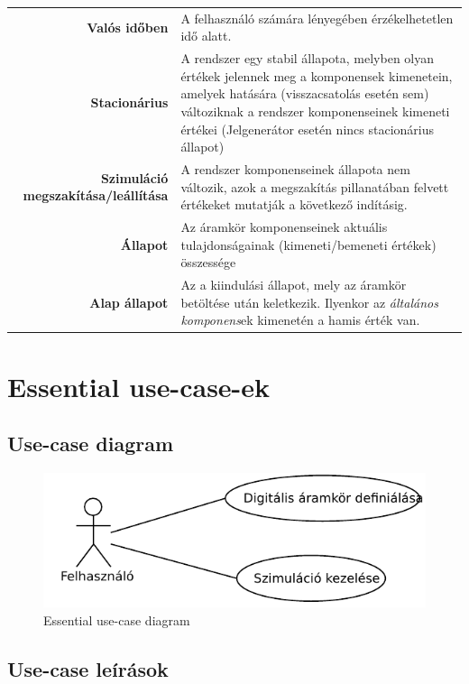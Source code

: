 \begin{longtable}{r p{10.95cm}}
\textbf{Valós időben} & A felhasználó számára lényegében érzékelhetetlen idő alatt.\\
\textbf{Stacionárius} & A rendszer egy stabil állapota, melyben olyan értékek jelennek meg a komponensek kimenetein, amelyek hatására (visszacsatolás esetén sem) változiknak a rendszer komponenseinek kimeneti értékei (Jelgenerátor esetén nincs stacionárius állapot)\\
\textbf{Szimuláció megszakítása/leállítása} & A rendszer komponenseinek állapota nem változik, azok a megszakítás pillanatában felvett értékeket mutatják a következő indításig.\\
\textbf{Állapot} & Az áramkör komponenseinek aktuális tulajdonságainak (kimeneti/bemeneti értékek) összessége \\
\textbf{Alap állapot} & Az a kiindulási állapot, mely az áramkör betöltése után keletkezik. Ilyenkor az \emph{általános komponens}ek kimenetén a hamis érték van.
\end{longtable}

\section{Essential use-case-ek}

\subsection{Use-case diagram}

\begin{figure}[h]
\begin{center}
\includegraphics{chapters/chapter02/usecase.pdf}
\caption{Essential use-case diagram}
\label{fig:useCase1}
\end{center}
\end{figure}


\subsection{Use-case leírások}


